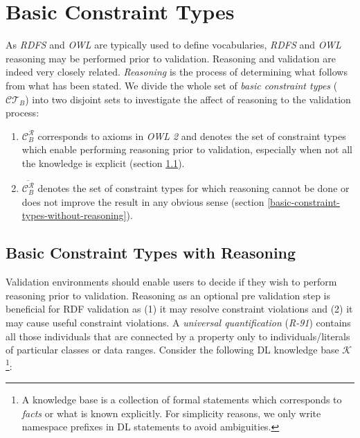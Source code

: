 \documentclass{llncs}
\newcommand{\tb}[1]{\todo[size=\small, color=green!40]{\textbf{Thomas:} #1}}
\newenvironment{DL}{
  \vspace{0cm}
	\begin{center}
  \begin{tabular}{c l}

}{
  \end{tabular}
	\end{center}
}
\begin{document}
{%
%


\section{Basic Constraint Types}
\label{basic-constraint-types}

As \emph{RDFS} and \emph{OWL} are typically used to define vocabularies, \emph{RDFS} and \emph{OWL} reasoning may be performed prior to validation. 
Reasoning and validation are indeed very closely related. 
\emph{Reasoning} is the process of determining what follows from what has been stated.
We divide the whole set of \emph{basic constraint types} ($\mathcal{CT}_{B}$) into two disjoint sets to investigate the affect of reasoning to the validation process: 
\begin{enumerate}
	\item $\mathcal{C}_B ^{\mathcal{R}}$ corresponds to axioms in \emph{OWL 2} and denotes the set of constraint types which enable performing reasoning prior to validation, especially when not all the knowledge is explicit (section \ref{basic-constraint-types-with-reasoning}).  
  \item $\overline{\mathcal{C}_B ^{\mathcal{R}}}$  denotes the set of constraint types for which reasoning cannot be done or does not improve the result in any obvious sense (section \ref{basic-constraint-types-without-reasoning}).
\end{enumerate}

\subsection{Basic Constraint Types with Reasoning}
\label{basic-constraint-types-with-reasoning}

Validation environments should enable users to decide if they wish to perform reasoning prior to validation.
Reasoning as an optional pre validation step is beneficial for RDF validation as 
(1) it may resolve constraint violations and  
(2) it may cause useful constraint violations.
A \emph{universal quantification} (\emph{R-91}) contains all those individuals that are connected by a property only to individuals/literals of particular classes  or data ranges.
Consider the following DL knowledge base $\mathcal{K}$\footnote{A knowledge base is a collection of formal statements which corresponds to \emph{facts} or what is known explicitly. For simplicity reasons, we only write namespace prefixes in DL statements to avoid ambiguities.}:

}
\end{document}
